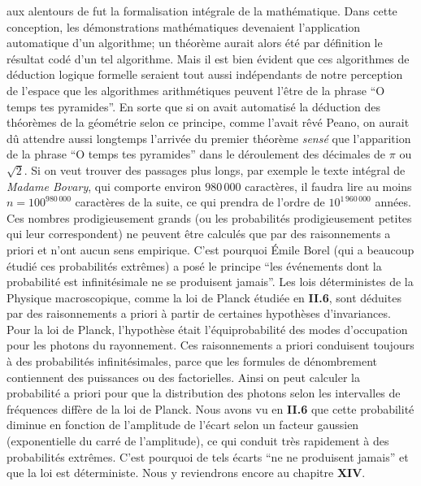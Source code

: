 aux alentours de {} fut la formalisation int\'egrale de la
math\'ematique.  Dans cette conception,  les d\'emonstrations math\'ematiques 
devenaient l'application automatique d'un algorithme;  un th\'eor\`eme 
aurait alors \'et\'e par d\'efinition le r\'esultat cod\'e d'un tel algorithme. 
Mais il est bien \'evident que ces algorithmes de d\'eduction logique 
formelle seraient tout aussi ind\'ependants de notre perception de 
l'espace que les algorithmes arithm\'etiques peuvent l'\^etre de la phrase 
``O temps tes pyramides''.  En sorte que si on avait automatis\'e la 
d\'eduction des th\'eor\`emes de la g\'eom\'etrie selon ce principe,  comme 
l'avait r\^ev\'e Peano,  on aurait d\^u attendre aussi longtemps 
l'arriv\'ee du premier th\'eor\`eme {\it sens\'e} que l'apparition de la phrase 
``O temps tes pyramides'' dans le d\'eroulement des d\'ecimales de $\pi$ 
ou $\sqrt{2}$. 
\medskip
Si on veut trouver des passages plus longs,  par exemple le texte 
int\'egral de {\it Madame Bovary},  qui comporte environ $980\, 000$ 
caract\`eres,  il faudra lire au moins $n = 100^{980\, 000}$ caract\`eres 
de la suite,  ce qui prendra de l'ordre de $10^{1\, 960\, 000}$ ann\'ees.
\medskip
Ces nombres prodigieusement grands (ou les probabilit\'es
prodigieusement petites qui leur correspondent) ne peuvent \^etre 
calcul\'es que par des raisonnements a priori et n'ont aucun sens 
empirique. C'est pourquoi \'Emile Borel (qui a beaucoup \'etudi\'e ces
probabilit\'es extr\^emes) a pos\'e le principe ``les \'ev\'enements dont 
la probabilit\'e est infinit\'esimale ne se produisent jamais''. 
\medskip
Les lois d\'eterministes de la Physique macroscopique, comme la loi de
Planck \'etudi\'ee en {\bf II.6}, sont d\'eduites par des raisonnements a 
priori \`a partir de certaines hypoth\`eses d'invariances. Pour la loi de
Planck, l'hypoth\`ese \'etait l'\'equiprobabilit\'e des modes d'occupation 
pour les photons du rayonnement. Ces raisonnements a priori conduisent
toujours \`a des probabilit\'es infinit\'esimales, parce que  les formules 
de d\'enombrement contiennent des puissances ou des factorielles. Ainsi
on peut calculer la probabilit\'e  a priori pour que la distribution des
photons selon les intervalles de  fr\'equences diff\`ere de la loi de 
Planck. Nous avons vu en {\bf II.6} que cette probabilit\'e diminue en
fonction de l'amplitude de l'\'ecart selon un facteur gaussien
(exponentielle du carr\'e de l'amplitude), ce qui conduit tr\`es 
rapidement \`a des probabilit\'es extr\^emes. C'est pourquoi de tels
\'ecarts ``ne ne produisent jamais'' et que la loi est d\'eterministe.
Nous y reviendrons encore au chapitre {\bf XIV}. 






\bye
